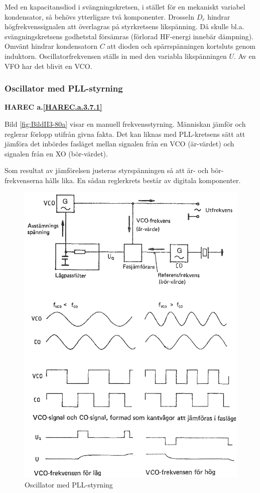 Med en kapacitansdiod i svängningskretsen, i stället för en mekaniskt
variabel kondensator, så behövs ytterligare två komponenter.
Drosseln \(D_r\) hindrar högfrekvenssignalen att överlagras på styrkretsens
likspänning.
Då skulle bl.a. svängningskretsens godhetstal försämras (förlorad HF-energi
innebär dämpning).
Omvänt hindrar kondensatorn \(C\) att dioden och spärrspänningen kortsluts genom
induktorn.
Oscillatorfrekvensen ställs in med den variabla likspänningen \(U\).
Av en VFO har det blivit en VCO.

\subsubsection{Oscillator med PLL-styrning}
\textbf{HAREC a.\ref{HAREC.a.3.7.1}\label{myHAREC.a.3.7.1}}

Bild \ref{fig:BildII3-80a} visar en manuell frekvensstyrning.
Människan jämför och reglerar förlopp utifrån givna fakta.
Det kan liknas med PLL-kretsens sätt att jämföra det inbördes fasläget mellan
signalen från en VCO (är-värdet) och signalen från en XO (bör-värdet).

Som resultat av jämförelsen justeras styrspänningen så att är- och
bör-frekvenserna hålls lika.
En sådan reglerkrets består av digitala komponenter.

\begin{figure}
  \includegraphics[width=\textwidth]{images/cropped_pdfs/bild_2_3-80b.pdf}
  \caption{Oscillator med PLL-styrning}
  \label{fig:BildII3-80b}
\end{figure}


